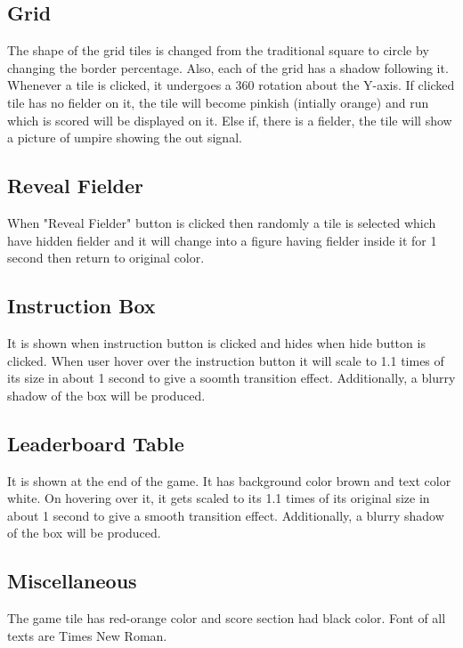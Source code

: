 \documentclass{article}
\begin{document}
\subsection{Grid}
The shape of the grid tiles is changed from the traditional square to circle by changing the border percentage. Also, each of the grid has a shadow following it. Whenever a tile is clicked, it undergoes a 360\textdegree{} rotation about the Y-axis. If clicked tile has no fielder on it, the tile will become pinkish (intially orange) and run which is scored will be displayed on it. Else if, there is a fielder, the tile will show a picture of umpire showing the out signal.
\subsection{Reveal Fielder}
When "Reveal Fielder" button is clicked then randomly a tile is selected which have hidden fielder and it will change into a figure having fielder inside it for 1 second then return to original color.
\subsection{Instruction Box}
It is shown when instruction button is clicked and hides when hide button is clicked. When user hover over the instruction button it will scale to 1.1 times of its size in about 1 second to give a soomth transition effect. Additionally, a blurry shadow of the box will be produced.
\subsection{Leaderboard Table}
It is shown at the end of the game. It has background color brown and text color white. On hovering over it, it gets scaled to its 1.1 times of its original size in about 1 second to give a smooth transition effect. Additionally, a blurry shadow of the box will be produced.
\subsection{Miscellaneous}
The game tile has red-orange color and score section had black color. Font of all texts are Times New Roman.
\end{document}
